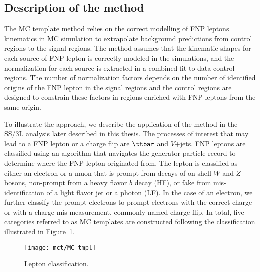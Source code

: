 



\subsection{Description of the method}

The MC template method relies on the correct modelling of FNP leptons kinematics in 
MC simulation to extrapolate background predictions from control regions to the signal regions.
The method assumes that the kinematic shapes for each source of FNP lepton is correctly modeled in the simulations, 
and the normalization for each source is extracted in a combined fit to data control regions.
The number of normalization factors depends on the number of identified origins of the FNP lepton in the signal regions
and the control regions are designed to constrain these factors in regions enriched with FNP leptons from the same origin.

To illustrate the approach, we describe the application of the method in 
the SS/3L analysis later described in this thesis.
The processes of interest that may lead to a FNP lepton or a charge flip are $\ttbar$ and $V$+jets. 
FNP leptons are classified using an algorithm that navigates the generator particle record to determine where the FNP lepton 
originated from. 
The lepton is classified as either an electron or a muon that is prompt from decays of on-shell $W$ and $Z$ bosons, 
non-prompt from a heavy flavor $b$ decay (HF), or fake from mis-identification of a light flavor jet or a photon (LF). 
In the case of an electron, we further classify the prompt electrons to prompt electrons with the correct charge or with a 
charge mis-measurement, commonly named charge flip.
In total, five categories referred to as MC templates are constructed 
following the classification illustrated 
in Figure~\ref{Figurefakes_classification}.

\begin{figure}[t!]
\centering
\texttt{[image: mct/MC-tmpl]}
\caption
{Lepton classification.
}
\label{Figurefakes_classification}
\end{figure}

